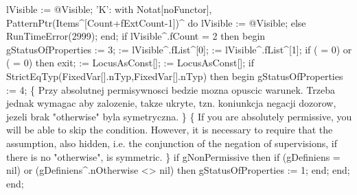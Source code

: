                                      lVisible := @Visible;
      'K':
         with Notat[noFunctor], PatternPtr(Items^[Count+fExtCount-1])^ do
                                   lVisible := @Visible;
      else RunTimeError(2999);
   end;
   if lVisible^.fCount = 2 then
   begin
      gStatusOfProperties := 3;
       := lVisible^.fList^[0];
       := lVisible^.fList^[1];
      if ( = 0) or ( = 0) then exit;
       := LocusAsConst[];
       := LocusAsConst[];
      if StrictEqTyp(FixedVar[].nTyp,FixedVar[].nTyp) then
      begin
         gStatusOfProperties := 4;
      \{ Przy absolutnej permisywnosci bedzie mozna opuscic
        warunek. Trzeba jednak wymagac aby zalozenie, takze
        ukryte, tzn. koniunkcja negacji dozorow, jezeli
        brak "otherwise" byla symetryczna.
      \}
      \{ If you are absolutely permissive, you will be able to skip
        the condition. However, it is necessary to require that the assumption, also
        hidden, i.e. the conjunction of the negation of supervisions, if
        there is no "otherwise", is symmetric.
      \}
         if gNonPermissive then
            if (gDefiniens = nil) or (gDefiniens^.nOtherwise <> nil) then
               gStatusOfProperties := 1;
      end;
   end;
end;
\eatline
{}\nwendcode{}\nwdocspar
\nwenddocs{}\endmoddef\nwstartdeflinemarkup{}\nwenddeflinemarkup
